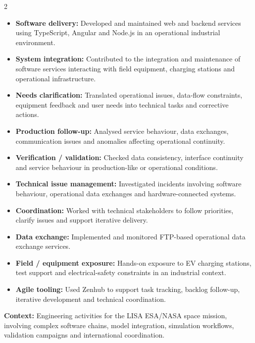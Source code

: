 \documentclass[8pt,a4paper,ragged2e,withhyper]{altacv}
\begin{document}
\begin{paracol}{2}
\begin{itemize}
  \item \textbf{Software delivery:} Developed and maintained web and backend services using TypeScript, Angular and Node.js in an operational industrial environment.
  \item \textbf{System integration:} Contributed to the integration and maintenance of software services interacting with field equipment, charging stations and operational infrastructure.
  \item \textbf{Needs clarification:} Translated operational issues, data-flow constraints, equipment feedback and user needs into technical tasks and corrective actions.
  \item \textbf{Production follow-up:} Analysed service behaviour, data exchanges, communication issues and anomalies affecting operational continuity.
  \item \textbf{Verification / validation:} Checked data consistency, interface continuity and service behaviour in production-like or operational conditions.
  \item \textbf{Technical issue management:} Investigated incidents involving software behaviour, operational data exchanges and hardware-connected systems.
  \item \textbf{Coordination:} Worked with technical stakeholders to follow priorities, clarify issues and support iterative delivery.
  \item \textbf{Data exchange:} Implemented and monitored FTP-based operational data exchange services.
  \item \textbf{Field / equipment exposure:} Hands-on exposure to EV charging stations, test support and electrical-safety constraints in an industrial context.
  \item \textbf{Agile tooling:} Used Zenhub to support task tracking, backlog follow-up, iterative development and technical coordination.
\end{itemize}

\divider


\textbf{Context:} Engineering activities for the LISA ESA/NASA space mission, involving complex software chains, model integration, simulation workflows, validation campaigns and international coordination.


\end{paracol}
\end{document}
